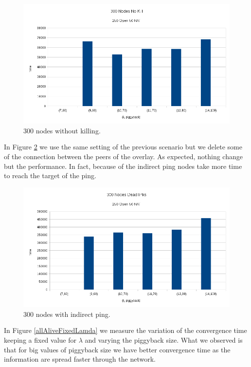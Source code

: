\documentclass[10pt,a4paper]{proc}
\begin{document}
\begin{figure}
\centering
\includegraphics[scale=0.35]{metrics/allAliveNoKill.png}
\caption{300 nodes without killing.}
\label{allAliveNoKill}
\end{figure}

In Figure \ref{allAliveIndirect} we use the same setting of the previous scenario but we delete some of the connection between the peers of the overlay. As expected, nothing change but the performance. In fact, because of the indirect ping nodes take more time to reach the target of the ping.

\begin{figure}
\centering
\includegraphics[scale=0.35]{metrics/allAliveIndirect.png}
\caption{300 nodes with indirect ping.}
\label{allAliveIndirect}
\end{figure}

In Figure \ref{allAliveFixedLamda} we measure the variation of the convergence time keeping a fixed value for $\lambda$ and varying the piggyback size. What we observed is that for big values of piggyback size we have better convergence time as the information are spread faster through the network.
\end{document}
